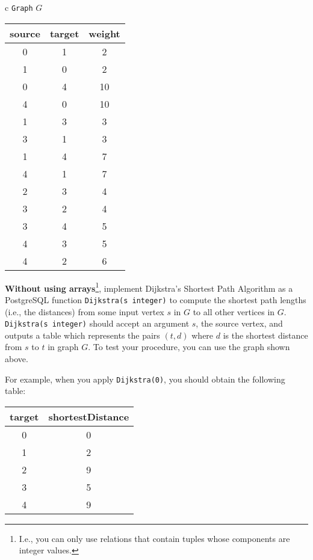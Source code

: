 \documentclass[10pt]{article}
\newcommand{\blue}[1]{{\color{blue}#1}}
\begin{document}
\begin{enumerate}[resume]
\begin{center}
\begin{tabular}{c}
{\tt Graph} $G$ \\
\begin{tabular}{|c|c|c|}\hline
source & target & weight \\ \hline\hline
0 & 1 & 2 \\
1 & 0 & 2 \\
0 & 4 & 10 \\
4 & 0 & 10 \\
1 & 3 & 3 \\
3 & 1 & 3 \\
1 & 4 & 7 \\
4 & 1 & 7 \\
2 & 3 & 4 \\
3 & 2 & 4 \\
3 & 4 & 5 \\
4 & 3 & 5 \\
4 & 2 & 6 \\ \hline
\end{tabular}
\end{tabular}
\end{center}

  \blue{\bf Without using arrays}\footnote{\blue{I.e., you can only use relations that contain tuples whose components are integer values.}},
  implement Dijkstra's Shortest Path Algorithm as a PostgreSQL function {\tt Dijkstra(s integer)}
  to compute the shortest path lengths (i.e., the distances) from some
  input vertex $s$ in $G$ to all other vertices in $G$. {\tt Dijkstra(s integer)}
  should accept an argument $s$, the source vertex, and outputs a table
  which represents the pairs $(t, d)$ where $d$ is the
  shortest distance from $s$ to $t$ in graph $G$. To test your procedure, you can
  use the graph shown above.


For example, when you apply {\tt Dijkstra(0)}, you should obtain the
following table:

\begin{center}
\begin{tabular}{|c|c|}\hline
target & shortestDistance \\ \hline\hline
0 & 0 \\
1 & 2 \\
2 & 9 \\
3 & 5 \\
4 & 9 \\ \hline
\end{tabular}
\end{center}



\end{enumerate}
\end{document}
